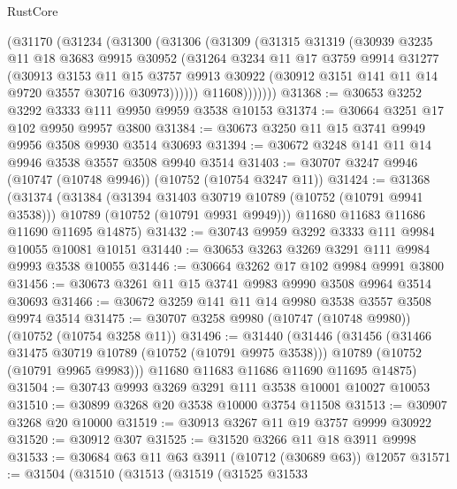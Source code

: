 \begin{lexlean}{RustCore}
\begin{coremodule}
          (@31170
            (@31234
              (@31300
                (@31306
                  (@31309
                    (@31315
                      @31319
                      (@30939
                        @3235
                        @11
                        @18
                        @3683
                        @9915
                        @30952
                        (@31264
                          @3234
                          @11
                          @17
                          @3759
                          @9914
                          @31277
                          (@30913
                            @3153
                            @11
                            @15
                            @3757
                            @9913
                            @30922
                            (@30912 @3151 @141 @11 @14 @9720 @3557 @30716 @30973))))))
                  @11608)))))))
@31368 := @30653 @3252 @3292 @3333 @111 @9950 @9959 @3538 @10153
@31374 := @30664 @3251 @17 @102 @9950 @9957 @3800
@31384 := @30673 @3250 @11 @15 @3741 @9949 @9956 @3508 @9930 @3514 @30693
@31394 := @30672 @3248 @141 @11 @14 @9946 @3538 @3557 @3508 @9940 @3514
@31403 := @30707 @3247 @9946 (@10747 (@10748 @9946)) (@10752 (@10754 @3247 @11))
@31424 := @31368
    (@31374
      (@31384
        (@31394 @31403 @30719 @10789 (@10752 (@10791 @9941 @3538)))
        @10789
        (@10752 (@10791 @9931 @9949)))
      @11680
      @11683
      @11686
      @11690
      @11695
      @14875)
@31432 := @30743 @9959 @3292 @3333 @111 @9984 @10055 @10081 @10151
@31440 := @30653 @3263 @3269 @3291 @111 @9984 @9993 @3538 @10055
@31446 := @30664 @3262 @17 @102 @9984 @9991 @3800
@31456 := @30673 @3261 @11 @15 @3741 @9983 @9990 @3508 @9964 @3514 @30693
@31466 := @30672 @3259 @141 @11 @14 @9980 @3538 @3557 @3508 @9974 @3514
@31475 := @30707 @3258 @9980 (@10747 (@10748 @9980)) (@10752 (@10754 @3258 @11))
@31496 := @31440
    (@31446
      (@31456
        (@31466 @31475 @30719 @10789 (@10752 (@10791 @9975 @3538)))
        @10789
        (@10752 (@10791 @9965 @9983)))
      @11680
      @11683
      @11686
      @11690
      @11695
      @14875)
@31504 := @30743 @9993 @3269 @3291 @111 @3538 @10001 @10027 @10053
@31510 := @30899 @3268 @20 @3538 @10000 @3754 @11508
@31513 := @30907 @3268 @20 @10000
@31519 := @30913 @3267 @11 @19 @3757 @9999 @30922
@31520 := @30912 @307
@31525 := @31520 @3266 @11 @18 @3911 @9998
@31533 := @30684 @63 @11 @63 @3911 (@10712 (@30689 @63)) @12057
@31571 := @31504
    (@31510
      (@31513
        (@31519
          (@31525
            @31533

\end{coremodule}
\end{lexlean}
